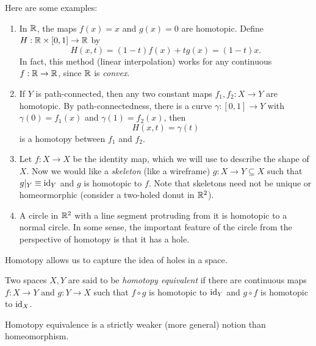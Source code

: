 \begin{example}
  Here are some examples:
  \begin{enumerate}
    \item In $\mathbb{R}$, the maps $f(x) = x$ and
      $g(x) = 0$ are homotopic. Define $H : \mathbb{R} \times [0, 1] \to \mathbb{R}$
      by
      \[
        H(x, t) = (1 - t)f(x) + t g(x) = (1 - t)x.
      \]
      In fact, this method (linear interpolation) works for any continuous
      $f : \mathbb{R} \to \mathbb{R}$, since $\mathbb{R}$ is
      \emph{convex}.
    \item If $Y$ is path-connected, then any
      two constant maps $f_1, f_2 : X \to Y$ are
      homotopic. By path-connectedness, there is a
      curve $\gamma : [0, 1] \to Y$ with $\gamma(0) = f_1(x)$
      and $\gamma(1) = f_2(x)$, then
      \[
        H(x, t) = \gamma(t)
      \]
      is a homotopy between $f_1$ and $f_2$.
    \item Let $f : X \to X$ be the identity map,
      which we will use to describe the shape of $X$.
      Now we would like a \emph{skeleton} (like a
      wireframe) $g : X \to Y \subseteq X$ such that
      $g|_Y \equiv \operatorname{id}_Y$ and $g$ is homotopic
      to $f$. Note that skeletons need not be unique
      or homeormorphic
      (consider a two-holed donut in $\mathbb{R}^2$).
    \item A circle in $\mathbb{R}^2$ with a line segment
      protruding from it is homotopic to a normal circle.
      In some sense, the important feature of the
      circle from the perspective of homotopy is
      that it has a hole.
  \end{enumerate}
\end{example}

\begin{remark}
  Homotopy allows us to capture the idea of holes in
  a space.
\end{remark}

\begin{definition}
  Two spaces $X, Y$ are said to be \emph{homotopy equivalent}
  if there are continuous maps $f : X \to Y$ and
  $g : Y \to X$ such that $f \circ g$ is homotopic
  to $\operatorname{id}_Y$ and $g \circ f$ is homotopic to $\operatorname{id}_X$.
\end{definition}

\begin{remark}
  Homotopy equivalence is a strictly weaker
  (more general) notion than homeomorphism.
\end{remark}
